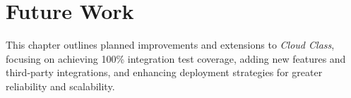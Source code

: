 \chapter{Future Work}

This chapter outlines planned improvements and extensions to \emph{Cloud Class}, focusing on achieving 100\% integration test coverage, adding new features and third-party integrations, and enhancing deployment strategies for greater reliability and scalability.





